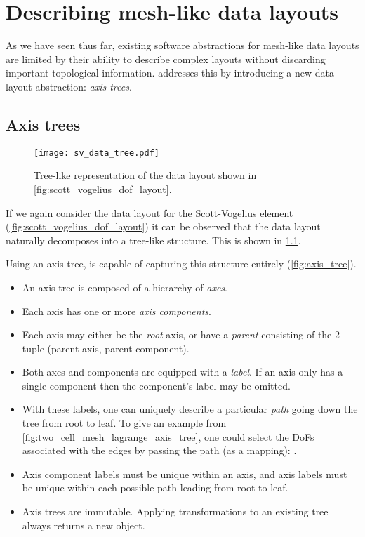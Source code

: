 \documentclass[thesis]{subfiles}
\begin{document}
\chapter{Describing mesh-like data layouts}
\label{chapter:axis_trees}

As we have seen thus far, existing software abstractions for mesh-like data layouts are limited by their ability to describe complex layouts without discarding important topological information.
 addresses this by introducing a new data layout abstraction: \textit{axis trees}.

\section{Axis trees}
\label{sec:axis_trees}

\begin{figure}
  \centering
  \texttt{[image: sv\_data\_tree.pdf]}
  \caption{Tree-like representation of the data layout shown in \cref{fig:scott_vogelius_dof_layout}.}
  \label{fig:sv_data_tree}
\end{figure}

If we again consider the data layout for the Scott-Vogelius element (\cref{fig:scott_vogelius_dof_layout}) it can be observed that the data layout naturally decomposes into a tree-like structure.
This is shown in \cref{fig:sv_data_tree}.

Using an axis tree,  is capable of capturing this structure entirely (\cref{fig:axis_tree}).

\begin{itemize}
  \item
    An axis tree is composed of a hierarchy of \textit{axes}.

  \item
    Each axis has one or more \textit{axis components}.

  \item
    Each axis may either be the \textit{root} axis, or have a \textit{parent} consisting of the 2-tuple (parent axis, parent component).

  \item
    Both axes and components are equipped with a \textit{label}.
    If an axis only has a single component then the component's label may be omitted.

  \item
    With these labels, one can uniquely describe a particular \textit{path} going down the tree from root to leaf.
    To give an example from \cref{fig:two_cell_mesh_lagrange_axis_tree}, one could select the DoFs associated with the edges by passing the path (as a mapping): .

  \item
    Axis component labels must be unique within an axis, and axis labels must be unique within each possible path leading from root to leaf.

  \item
    Axis trees are immutable. Applying transformations to an existing tree always returns a new object.
\end{itemize}
\end{document}
